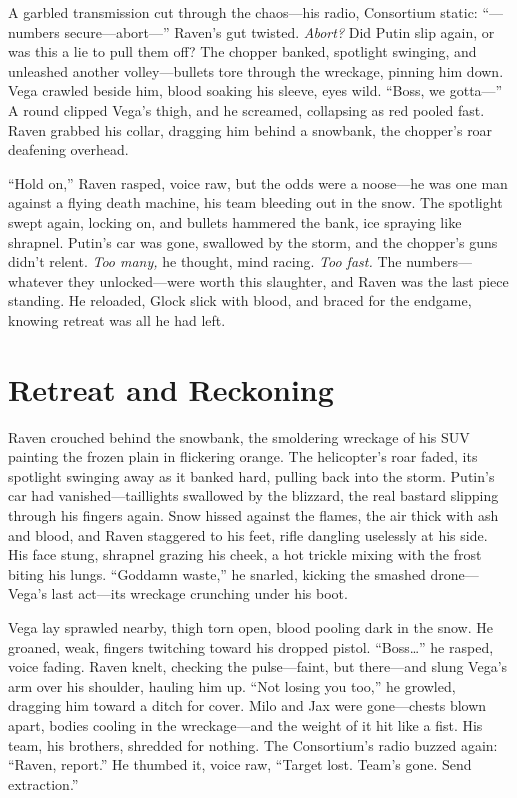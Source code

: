 \documentclass[12pt]{book}
\begin{document}
A garbled transmission cut through the chaos—his radio, Consortium static: “—numbers secure—abort—” Raven’s gut twisted. \textit{Abort?} Did Putin slip again, or was this a lie to pull them off? The chopper banked, spotlight swinging, and unleashed another volley—bullets tore through the wreckage, pinning him down. Vega crawled beside him, blood soaking his sleeve, eyes wild. “Boss, we gotta—” A round clipped Vega’s thigh, and he screamed, collapsing as red pooled fast. Raven grabbed his collar, dragging him behind a snowbank, the chopper’s roar deafening overhead.

“Hold on,” Raven rasped, voice raw, but the odds were a noose—he was one man against a flying death machine, his team bleeding out in the snow. The spotlight swept again, locking on, and bullets hammered the bank, ice spraying like shrapnel. Putin’s car was gone, swallowed by the storm, and the chopper’s guns didn’t relent. \textit{Too many,} he thought, mind racing. \textit{Too fast.} The numbers—whatever they unlocked—were worth this slaughter, and Raven was the last piece standing. He reloaded, Glock slick with blood, and braced for the endgame, knowing retreat was all he had left.

\section{Retreat and Reckoning}

Raven crouched behind the snowbank, the smoldering wreckage of his SUV painting the frozen plain in flickering orange. The helicopter’s roar faded, its spotlight swinging away as it banked hard, pulling back into the storm. Putin’s car had vanished—taillights swallowed by the blizzard, the real bastard slipping through his fingers again. Snow hissed against the flames, the air thick with ash and blood, and Raven staggered to his feet, rifle dangling uselessly at his side. His face stung, shrapnel grazing his cheek, a hot trickle mixing with the frost biting his lungs. “Goddamn waste,” he snarled, kicking the smashed drone—Vega’s last act—its wreckage crunching under his boot.

Vega lay sprawled nearby, thigh torn open, blood pooling dark in the snow. He groaned, weak, fingers twitching toward his dropped pistol. “Boss…” he rasped, voice fading. Raven knelt, checking the pulse—faint, but there—and slung Vega’s arm over his shoulder, hauling him up. “Not losing you too,” he growled, dragging him toward a ditch for cover. Milo and Jax were gone—chests blown apart, bodies cooling in the wreckage—and the weight of it hit like a fist. His team, his brothers, shredded for nothing. The Consortium’s radio buzzed again: “Raven, report.” He thumbed it, voice raw, “Target lost. Team’s gone. Send extraction.”
\end{document}
